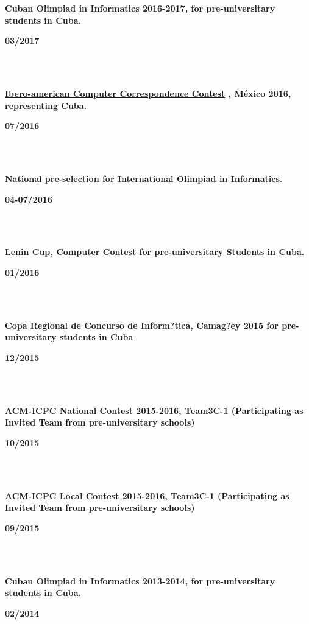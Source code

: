 \documentclass{article}
\begin{document}
\begin{minipage}{0.8\textwidth}
    \parbox{0.8\linewidth}{\textbf{Cuban Olimpiad in Informatics 2016-2017, for pre-universitary students in Cuba.}} \hfill \textbf{03/2017}\\
    \\
\end{minipage}\\
\begin{minipage}{0.8\textwidth}
    \parbox{0.8\linewidth}{\textbf{\hyperref[sec:ibero]{Ibero-american Computer Correspondence Contest} , México 2016, representing  Cuba.}} \hfill \textbf{07/2016}\\
    \\
\end{minipage}\\
\begin{minipage}{0.8\textwidth}
    \parbox{0.8\linewidth}{\textbf{National pre-selection for International Olimpiad in Informatics.}} \hfill \textbf{04-07/2016}\\
    \\
\end{minipage}\\
\begin{minipage}{0.8\textwidth}
    \parbox{0.8\linewidth}{\textbf{Lenin Cup, Computer Contest for pre-universitary Students in Cuba.}} \hfill \textbf{01/2016}\\
    \\
\end{minipage}\\
\begin{minipage}{0.8\textwidth}
    \parbox{0.8\linewidth}{\textbf{Copa Regional de Concurso de Inform?tica, Camag?ey 2015 for pre-universitary students in Cuba}} \hfill \textbf{12/2015}\\
    \\
\end{minipage}\\
\begin{minipage}{0.8\textwidth}
    \parbox{0.8\linewidth}{\textbf{ACM-ICPC National Contest 2015-2016, Team3C-1 (Participating as  Invited Team from pre-universitary schools)}} \hfill \textbf{10/2015}\\
    \\
\end{minipage}\\
\begin{minipage}{0.8\textwidth}
    \parbox{0.8\linewidth}{\textbf{ACM-ICPC Local Contest 2015-2016, Team3C-1 (Participating as  Invited Team from pre-universitary schools)}} \hfill \textbf{09/2015}\\
    \\
\end{minipage}\\
\begin{minipage}{0.8\textwidth}
    \parbox{0.8\linewidth}{\textbf{Cuban Olimpiad in Informatics 2013-2014, for pre-universitary students in Cuba.}} \hfill \textbf{02/2014}\\
    \\
\end{minipage}\\
\end{document}
